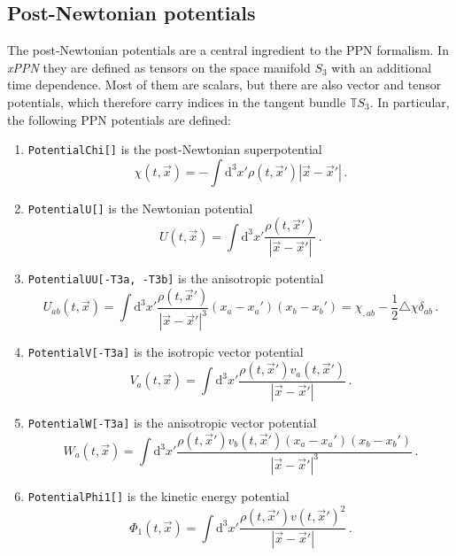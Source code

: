 \documentclass[notitlepage,a4paper,aps,prd,onecolumn,superscriptaddress,nofootinbib,groupedaddress,longbibliography]{revtex4-1}
\newcommand{\dd}{\mathrm{d}}
\newcommand{\xPPN}{\emph{xPPN}}
\begin{document}
\subsection{Post-Newtonian potentials}\label{ssec:potdef}
The post-Newtonian potentials are a central ingredient to the PPN formalism. In \xPPN{} they are defined as tensors on the space manifold \(S_3\) with an additional time dependence. Most of them are scalars, but there are also vector and tensor potentials, which therefore carry indices in the tangent bundle \(\mathbb{T}S_3\). In particular, the following PPN potentials are defined:
\begin{enumerate}
\item
\lstinline/PotentialChi[]/ is the post-Newtonian superpotential
\begin{equation}
\chi(t, \vec{x}) = -\int \dd^3x'\rho(t, \vec{x}')|\vec{x} - \vec{x}'|\,.
\end{equation}
\item
\lstinline/PotentialU[]/ is the Newtonian potential
\begin{equation}
U(t, \vec{x}) = \int \dd^3x'\frac{\rho(t, \vec{x}')}{|\vec{x} - \vec{x}'|}\,.
\end{equation}
\item
\lstinline/PotentialUU[-T3a, -T3b]/ is the anisotropic potential
\begin{equation}
U_{ab}(t, \vec{x}) = \int \dd^3x'\frac{\rho(t, \vec{x}')}{|\vec{x} - \vec{x}'|^3}(x_a - x_a')(x_b - x_b') = \chi_{,ab} - \frac{1}{2}\triangle\chi\delta_{ab}\,.
\end{equation}
\item
\lstinline/PotentialV[-T3a]/ is the isotropic vector potential
\begin{equation}
V_a(t, \vec{x}) = \int \dd^3x'\frac{\rho(t, \vec{x}')v_a(t, \vec{x}')}{|\vec{x} - \vec{x}'|}\,.
\end{equation}
\item
\lstinline/PotentialW[-T3a]/ is the anisotropic vector potential
\begin{equation}
W_a(t, \vec{x}) = \int \dd^3x'\frac{\rho(t, \vec{x}')v_b(t, \vec{x}')(x_a - x_a')(x_b - x_b')}{|\vec{x} - \vec{x}'|^3}\,.
\end{equation}
\item
\lstinline/PotentialPhi1[]/ is the kinetic energy potential
\begin{equation}
\Phi_1(t, \vec{x}) = \int \dd^3x'\frac{\rho(t, \vec{x}')v(t, \vec{x}')^2}{|\vec{x} - \vec{x}'|}\,.
\end{equation}

\end{enumerate}
\end{document}

